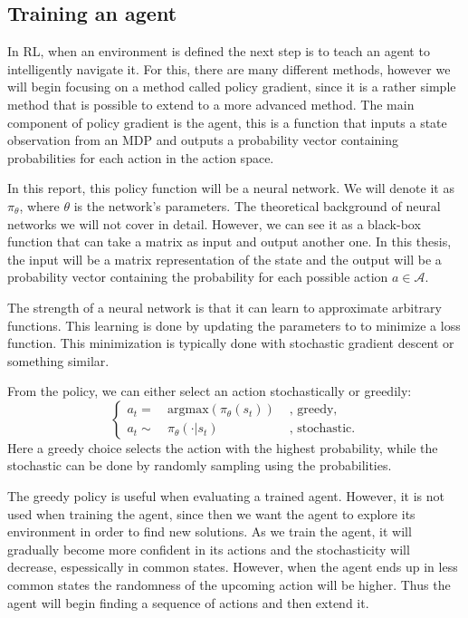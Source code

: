 \documentclass[12pt,A4]{report}
\theoremstyle{definition}
\begin{document}
\subsection{Training an agent}

In RL, when an environment is defined the next step is to teach an agent to intelligently navigate it. For this, there are many different methods, however we will begin focusing on a method called policy gradient, since it is a rather simple method that is possible to extend to a more advanced method. The main component of policy gradient is the agent, this is a function that inputs a state observation from an MDP and outputs a probability vector containing probabilities for each action in the action space. 

In this report, this policy function will be a neural network. We will denote it as $\pi_\theta$, where $\theta$ is the network's parameters. The theoretical background of neural networks we will not cover in detail. However, we can see it as a black-box function that can take a matrix as input and output another one. In this thesis, the input will be a matrix representation of the state and the output will be a probability vector containing the probability for each possible action $a \in \mathcal{A}$. 

The strength of a neural network is that it can learn to approximate arbitrary functions. This learning is done by updating the parameters to to minimize a loss function. This minimization is typically done with stochastic gradient descent or something similar.  

From the policy, we can either select an action stochastically or greedily:
\begin{equation*}
  \left\{ 
  \begin{aligned}
    a_t =& \ \text{argmax}(\pi_\theta(s_t))& \text{ , greedy,} \\
    a_t \sim& \ \pi_\theta(\cdot | s_t)& \text{ , stochastic}.
  \end{aligned}
  \right.
\end{equation*}
Here a greedy choice selects the action with the highest probability, while the stochastic can be done by randomly sampling using the probabilities. 

The greedy policy is useful when evaluating a trained agent. However, it is not used when training the agent, since then we want the agent to explore its environment in order to find new solutions. As we train the agent, it will gradually become more confident in its actions and the stochasticity will decrease, espessically in common states. However, when the agent ends up in less common states the randomness of the upcoming action will be higher. Thus the agent will begin finding a sequence of actions and then extend it.
\end{document}
